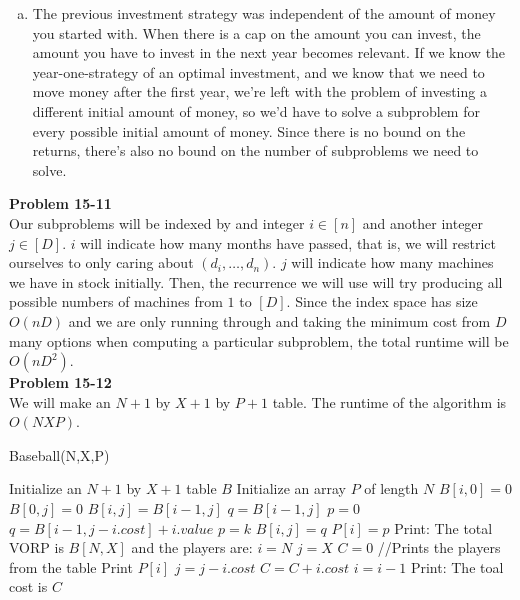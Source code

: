\documentclass{article}
\begin{document}
\begin{enumerate}[a.]
\item The previous investment strategy was independent of the amount of money you started with.  When there is a cap on the amount you can invest, the amount you have to invest in the next year becomes relevant.  If we know the year-one-strategy of an optimal investment, and we know that we need to move money after the first year, we're left with the problem of investing a different initial amount of money, so we'd have to solve a subproblem for every possible initial amount of money.  Since there is no bound on the returns, there's also no bound on the number of subproblems we need to solve.


\end{enumerate}

\noindent\textbf{Problem 15-11}\\

Our subproblems will be indexed by and integer $i\in[n]$ and another integer $j\in[D]$. $i$ will indicate how many months have passed, that is, we will restrict ourselves to only caring about $(d_i, \ldots,d_n)$. $j$ will indicate how many machines we have in stock initially. Then, the recurrence we will use will try producing all possible numbers of machines from $1$ to $[D]$. Since the index space has size $O(nD)$ and we are only running through and taking the minimum cost from $D$ many options when computing a particular subproblem, the total runtime will be $O(nD^2)$.  \\

\noindent\textbf{Problem 15-12}\\

We will make an $N+1$ by $X+1$ by $P+1$ table. The runtime of the algorithm is $O(NXP)$.

\begin{algorithm}
\caption{Baseball(N,X,P)}
\begin{algorithmic}
\State Initialize an  $N+1$ by $X+1$ table $B$
\State Initialize an array $P$ of length $N$
	\State $B[i,0] = 0$
\EndFor
{}
	\State $B[0,j] = 0$
\EndFor
{}
			\State $B[i,j] = B[i-1,j]$
		\EndIf
		\State $q = B[i-1,j]$
		\State $p = 0$
				\State $q = B[i-1,j-i.cost] + i.value$
				\State $p = k$
			\EndIf
		\EndFor
		\State $B[i,j] = q$
		\State $P[i] = p$
	\EndFor
\EndFor
\State Print: The total VORP is $B[N,X]$ and the players are:
\State $i = N$ 
\State $j = X$
\State $C = 0$
 //Prints the players from the table
		\State Print $P[i]$
		\State $j = j - i.cost$
		\State $C = C + i.cost$
	\EndIf
	\State $i = i - 1$
\EndFor
\State Print: The toal cost is $C$
\end{algorithmic}
\end{algorithm}
\end{document}
